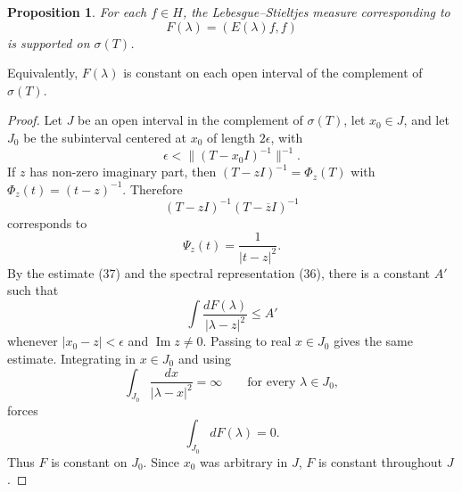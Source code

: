 \documentclass[11pt,openany]{book}
\newtheorem{proposition}[theorem]{Proposition}
\begin{document}
\begin{proposition}
For each $f\in H$, the Lebesgue--Stieltjes measure corresponding to
\[
F(\lambda)=(E(\lambda)f,f)
\]
is supported on $\sigma(T)$.
\end{proposition}

Equivalently, $F(\lambda)$ is constant on each open interval of the complement of $\sigma(T)$.

\begin{proof}
Let $J$ be an open interval in the complement of $\sigma(T)$, let $x_0\in J$, and let $J_0$ be the subinterval centered at $x_0$ of length $2\epsilon$, with
\[
\epsilon<\|(T-x_0I)^{-1}\|^{-1}.
\]
If $z$ has non-zero imaginary part, then $(T-zI)^{-1}=\Phi_z(T)$ with $\Phi_z(t)=(t-z)^{-1}$. Therefore
\[
(T-zI)^{-1}(T-\overline z I)^{-1}
\]
corresponds to
\[
\Psi_z(t)=\frac1{|t-z|^2}.
\]
By the estimate (37) and the spectral representation (36), there is a constant $A'$ such that
\[
\int\frac{dF(\lambda)}{|\lambda-z|^2}\leq A'
\]
whenever $|x_0-z|<\epsilon$ and $\operatorname{Im}z\neq0$. Passing to real $x\in J_0$ gives the same estimate. Integrating in $x\in J_0$ and using
\[
\int_{J_0}\frac{dx}{|\lambda-x|^2}=\infty
\qquad\text{for every }\lambda\in J_0,
\]
forces
\[
\int_{J_0}dF(\lambda)=0.
\]
Thus $F$ is constant on $J_0$. Since $x_0$ was arbitrary in $J$, $F$ is constant throughout $J$.
\end{proof}
\end{document}
